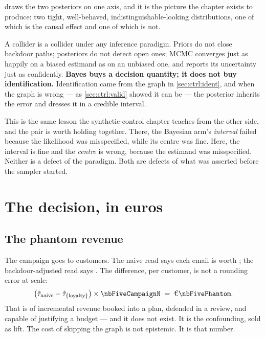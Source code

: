 draws the two posteriors on one axis, and it is the picture the chapter
exists to produce: two tight, well-behaved, indistinguishable-looking distributions, one of which
is the causal effect and one of which is not.

A collider is a collider under any inference paradigm. Priors do not close backdoor paths;
posteriors do not detect open ones; MCMC converges just as happily on a biased estimand as on an
unbiased one, and reports its uncertainty just as confidently. \textbf{Bayes buys a decision
quantity; it does not buy identification.} Identification came from the graph in
\cref{sec:ctrl:ident}, and when the graph is wrong --- as \cref{sec:ctrl:valid} showed it can be
--- the posterior inherits the error and dresses it in a credible interval.

This is the same lesson the synthetic-control chapter teaches from the other side, and the pair is
worth holding together. There, the Bayesian arm's \emph{interval} failed because the likelihood was
misspecified, while its centre was fine. Here, the interval is fine and the \emph{centre} is
wrong, because the estimand was misspecified. Neither is a defect of the paradigm. Both are
defects of what was asserted before the sampler started.

\section{The decision, in euros}
\label{sec:ctrl:euro}

\subsection*{The phantom revenue}

The campaign goes to \nbFiveCampaignN{} customers. The naive read says each email is worth
\eur{\nbFiveNaiveEst}; the backdoor-adjusted read says \eur{\nbFiveAdjEst}. The difference,
\eur{\nbFivePhantomPerCustomer} per customer, is not a rounding error at scale:
%
\begin{equation}
  \big(\hat\tau_{\text{naive}} - \hat\tau_{\{\text{loyalty}\}}\big) \times \nbFiveCampaignN
  \;=\; \eur{\nbFivePhantom} .
  \label{eq:ctrl:phantom}
\end{equation}
%
That is \eur{\nbFivePhantom} of incremental revenue booked into a plan, defended in a review, and
capable of justifying a budget --- and it does not exist. It is the confounding, sold as lift.
The cost of skipping the graph is not epistemic. It is that number.

